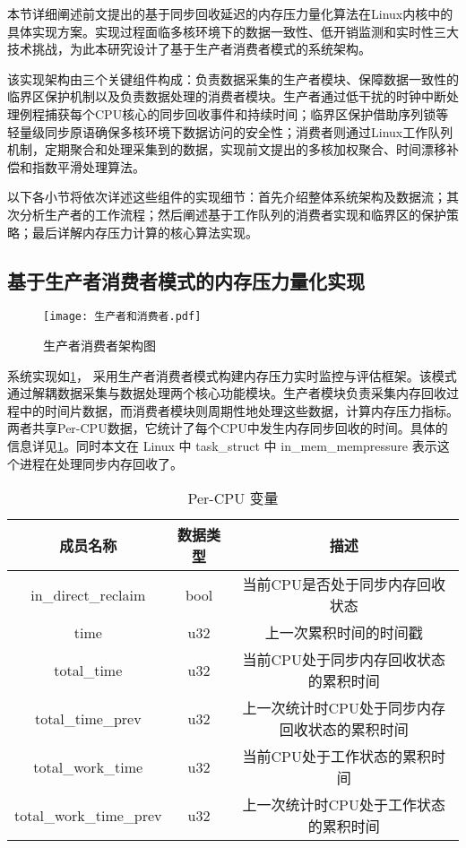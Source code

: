 本节详细阐述前文提出的基于同步回收延迟的内存压力量化算法在Linux内核中的具体实现方案。实现过程面临多核环境下的数据一致性、低开销监测和实时性三大技术挑战，为此本研究设计了基于生产者消费者模式的系统架构。

该实现架构由三个关键组件构成：负责数据采集的生产者模块、保障数据一致性的临界区保护机制以及负责数据处理的消费者模块。生产者通过低干扰的时钟中断处理例程捕获每个CPU核心的同步回收事件和持续时间；临界区保护借助序列锁等轻量级同步原语确保多核环境下数据访问的安全性；消费者则通过Linux工作队列机制，定期聚合和处理采集到的数据，实现前文提出的多核加权聚合、时间漂移补偿和指数平滑处理算法。

以下各小节将依次详述这些组件的实现细节：首先介绍整体系统架构及数据流；其次分析生产者的工作流程；然后阐述基于工作队列的消费者实现和临界区的保护策略；最后详解内存压力计算的核心算法实现。

\subsection{基于生产者消费者模式的内存压力量化实现}

\begin{figure}[H]
    \centering
    \texttt{[image: 生产者和消费者.pdf]}
    \caption{生产者消费者架构图}
    \label{fig:producer-consumer}
\end{figure}

系统实现如\ref{fig:producer-consumer}， 采用生产者消费者模式构建内存压力实时监控与评估框架。该模式通过解耦数据采集与数据处理两个核心功能模块。生产者模块负责采集内存回收过程中的时间片数据，而消费者模块则周期性地处理这些数据，计算内存压力指标。两者共享Per-CPU数据，它统计了每个CPU中发生内存同步回收的时间。具体的信息详见\ref{tab:sensor_data}。同时本文在 Linux 中 task\_struct 中 in\_mem\_mempressure 表示这个进程在处理同步内存回收了。

\begin{table}[htbp]
    \centering
    \caption{Per-CPU 变量}
    \label{tab:sensor_data}
    \begin{tabular}{ccc}
        \toprule
        成员名称& 数据类型     & 描述                                        \\ \midrule
        in\_direct\_reclaim & bool & 当前CPU是否处于同步内存回收状态\\
        \midrule
        time & u32 & 上一次累积时间的时间戳\\
        \midrule
        total\_time &u32&当前CPU处于同步内存回收状态的累积时间\\
        \midrule
        total\_time\_prev&u32&上一次统计时CPU处于同步内存回收状态的累积时间\\
        \midrule
        total\_work\_time&u32&当前CPU处于工作状态的累积时间\\
        \midrule
        total\_work\_time\_prev&u32&上一次统计时CPU处于工作状态的累积时间\\
        \bottomrule
    \end{tabular}
  \end{table}

